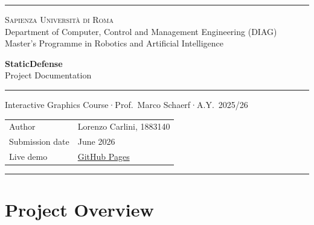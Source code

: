 \documentclass[11pt, a4paper]{article}
\begin{document}
	\begin{titlepage}
		\centering

		{\color{AccentBlue}\rule{\textwidth}{2pt}}

		\vspace*{20mm}

		{\large\scshape Sapienza Universit\`a di Roma}\\[3pt]
		{\small\color{MidGray}Department of Computer, Control and Management Engineering (DIAG)}\\[2pt]
		{\small\color{MidGray}Master's Programme in Robotics and Artificial Intelligence}

		\vspace{16mm}

		{\fontsize{42}{48}\selectfont\bfseries\color{DarkSlate}StaticDefense}\\[10pt]
		{\large\color{MidGray}Project Documentation}

		\vspace{10mm}
		{\color{AccentBlue}\rule{0.55\textwidth}{0.8pt}}
		\vspace{10mm}

		{\small\color{AccentBlue}Interactive Graphics Course\enspace·\enspace Prof.\ Marco Schaerf\enspace·\enspace A.Y.\ 2025/26}

		\vfill

		\begin{tabular}{l@{\hskip 8pt}l}
			{\small\color{MidGray}Author}           & {\small Lorenzo Carlini, 1883140} \\[5pt]
			{\small\color{MidGray}Submission date}  & {\small June 2026} \\[5pt]
			{\small\color{MidGray}Live demo}        & {\small\href{https://sapienzainteractivegraphicscourse.github.io/final-project-interactivelan/}{GitHub Pages}} \\
		\end{tabular}

		\vspace{10mm}

		{\color{AccentBlue}\rule{\textwidth}{2pt}}
	\end{titlepage}

	{\small\tableofcontents}
	\newpage

	\section{Project Overview}
\end{document}
